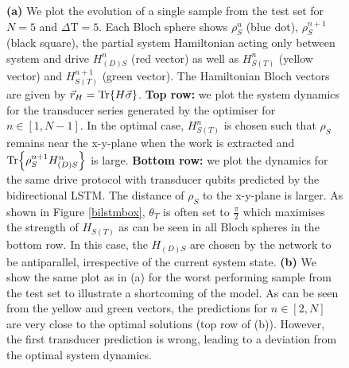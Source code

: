 \begin{figure}[H]
	\caption{\textbf{(a)} We plot the evolution of a single sample from the test set for $N=5$ and $\Delta \mathrm{T} = 5$. Each Bloch sphere shows $\rho_S^n$ (blue dot), $\rho_S^{n+1}$ (black square), the partial system Hamiltonian acting only between system and drive $H_{(D)S}^n$ (red vector) as well as $H_{S(T)}^n$ (yellow vector) and $H_{S(T)}^{n+1}$ (green vector). The Hamiltonian Bloch vectors are given by $\vec{r}_H = \Tr{H \vec{\sigma}}$. \textbf{Top row:} we plot the system dynamics for the transducer series generated by the optimiser for $n \in [1, N - 1]$. In the optimal case, $H_{S(T)}^n$ is chosen such that $\rho_S$ remains near the x-y-plane when the work is extracted and $\Tr{\rho_S^{n+1} H_{(D)S}^n}$ is large. \textbf{Bottom row:} we plot the dynamics for the same drive protocol with transducer qubits predicted by the bidirectional LSTM. The distance of $\rho_S$ to the x-y-plane is larger. As shown in Figure \ref{bilstmbox}, $\theta_T$ is often set to $\frac{\pi}{2}$ which maximises the strength of $H_{S(T)}$ as can be seen in all Bloch spheres in the bottom row. In this case, the $H_{(D)S}$ are chosen by the network to be antiparallel, irrespective of the current system state.
	\textbf{(b)} We show the same plot as in (a) for the worst performing sample from the test set to illustrate a shortcoming of the model. As can be seen from the yellow and green vectors, the predictions for $n \in [2, N]$ are very close to the optimal solutions (top row of (b)). However, the first transducer prediction is wrong, leading to a deviation from the optimal system dynamics.}
	\label{n_5_blochs}
\end{figure}

